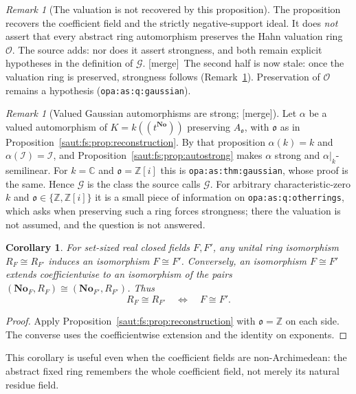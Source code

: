 \documentclass[11pt]{article}
\newtheorem{corollary}[theorem]{Corollary}
\theoremstyle{definition}
\theoremstyle{remark}
\newtheorem{remark}[theorem]{Remark}
\newcommand{\No}{\mathbf{No}}
\newcommand{\C}{\mathbb C}
\newcommand{\Z}{\mathbb Z}
\newcommand{\OO}{\mathcal O}
\newcommand{\lbl}[1]{\nolinkurl{#1}}%
\newcommand{\Ineg}{\mathcal I}
\newcommand{\mergetag}{\textup{[merge]}}
\numberwithin{equation}{section}
\begin{document}
\begin{remark}[The valuation is not recovered by this proposition]\label{saut:fs:rem:valuation}
The proposition recovers the coefficient field and the strictly negative-support
ideal. It does \emph{not} assert that every abstract ring automorphism preserves
the Hahn valuation ring $\OO$. The source adds: nor does it assert strongness, and
both remain explicit hypotheses in the definition of $\mathcal G$. \mergetag\ The
second half is now stale: once the valuation ring is preserved, strongness follows
(Remark~\ref{saut:fs:rem:gaussianstrong}). Preservation of $\OO$ remains a hypothesis
(\lbl{opa:as:q:gaussian}).
\end{remark}

\begin{remark}[Valued Gaussian automorphisms are strong; \mergetag]\label{saut:fs:rem:gaussianstrong}
Let $\alpha$ be a valued automorphism of $K=k((t^{\No}))$ preserving $A_{\mathfrak o}$,
with $\mathfrak o$ as in Proposition~\ref{saut:fs:prop:reconstruction}. By that
proposition $\alpha(k)=k$ and $\alpha(\Ineg)=\Ineg$, and
Proposition~\ref{saut:fs:prop:autostrong} makes $\alpha$ strong and
$\alpha|_k$-semilinear. For $k=\C$ and $\mathfrak o=\Z[i]$ this is
\lbl{opa:as:thm:gaussian}, whose proof is the same. Hence $\mathcal G$ is the class
the source calls $\mathcal G$. For arbitrary characteristic-zero $k$ and
$\mathfrak o\in\{\Z,\Z[i]\}$ it is a small piece of information on
\lbl{opa:as:q:otherrings}, which asks when preserving such a ring forces strongness;
there the valuation is not assumed, and the question is not answered.
\end{remark}

\begin{corollary}\label{saut:fs:cor:recover-pairs}
For set-sized real closed fields $F,F'$, any unital ring isomorphism $R_F\cong R_{F'}$
induces an isomorphism $F\cong F'$. Conversely, an isomorphism $F\cong F'$ extends
coefficientwise to an isomorphism of the pairs $(\No_F,R_F)\cong(\No_{F'},R_{F'})$.
Thus
\[
 R_F\cong R_{F'}\quad\Longleftrightarrow\quad F\cong F'.
\]
\end{corollary}
\begin{proof}
Apply Proposition~\ref{saut:fs:prop:reconstruction} with $\mathfrak o=\Z$ on each side.
The converse uses the coefficientwise extension and the identity on exponents.
\end{proof}

This corollary is useful even when the coefficient fields are non-Archimedean: the
abstract fixed ring remembers the whole coefficient field, not merely its natural
residue field.
\end{document}
